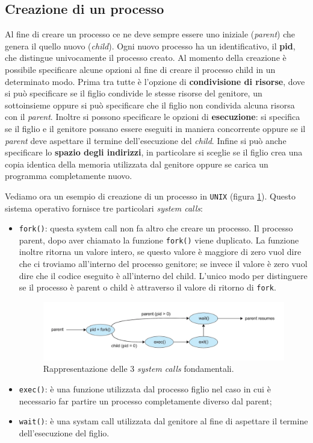 \subsection{Creazione di un processo}\label{creazione di un processo}
Al fine di creare un processo ce ne deve sempre essere uno iniziale (\textit{parent}) che genera il quello nuovo (\textit{child}). Ogni nuovo processo ha un identificativo, il \textbf{pid}, che distingue univocamente il processo creato. Al momento della creazione è possibile specificare alcune opzioni al fine di creare il processo child in un determinato modo. Prima tra tutte è l'opzione di \textbf{condivisione di risorse}, dove si può specificare se il figlio condivide le stesse risorse del genitore, un sottoinsieme oppure si può specificare che il figlio non condivida alcuna risorsa con il \textit{parent}. Inoltre si possono specificare le opzioni di \textbf{esecuzione}: si specifica se il figlio e il genitore possano essere eseguiti in maniera concorrente oppure se il \textit{parent} deve aspettare il termine dell'esecuzione del \textit{child}. Infine si può anche specificare lo \textbf{spazio degli indirizzi}, in particolare si sceglie se il figlio crea una copia identica della memoria utilizzata dal genitore oppure se carica un programma completamente nuovo.

Vediamo ora un esempio di creazione di un processo in \texttt{UNIX} (figura \ref{fig:fork}). Questo sistema operativo fornisce tre particolari \textit{system calls}:

\vspace{-5px}
\begin{itemize}
\setlength{\itemsep}{-.15 em}
    \item \texttt{fork()}: questa system call non fa altro che creare un processo. Il processo parent, dopo aver chiamato la funzione \texttt{fork()} viene duplicato. La funzione inoltre ritorna un valore intero, se questo valore è maggiore di zero vuol dire che ci troviamo all'interno del processo genitore; se invece il valore è zero vuol dire che il codice eseguito è all'interno del child. L'unico modo per distinguere se il processo è parent o child è attraverso il valore di ritorno di \texttt{fork}.
    \begin{figure}[h]
    \centering
    \includegraphics[width = .75\textwidth]{../res/imgs/processes/fork.png}
    \caption{Rappresentazione delle 3 \textit{system calls} fondamentali.}
    \label{fig:fork}
\end{figure}
    \item \texttt{exec()}: è una funzione utilizzata dal processo figlio nel caso in cui è necessario far partire un processo completamente diverso dal parent;
    \item \texttt{wait()}: è una systam call utilizzata dal genitore al fine di aspettare il termine dell'esecuzione del figlio.
\end{itemize}


